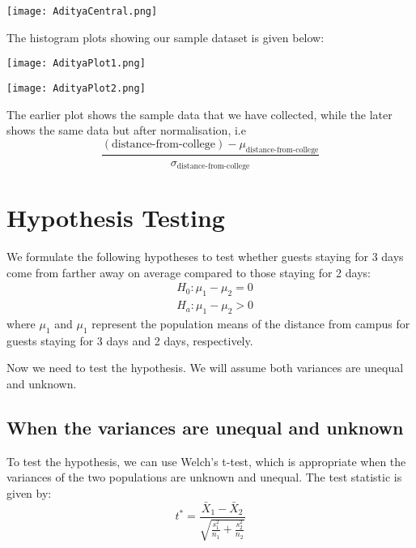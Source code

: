\documentclass[oneside]{book}
\begin{document}
\begin{minipage}{\textwidth}
    \centering
    \texttt{[image: AdityaCentral.png]}
    \label{fig:enter-label}
\end{minipage}

The histogram plots showing our sample dataset is given below:

\begin{minipage}{\textwidth}
    \centering
    \texttt{[image: AdityaPlot1.png]}
    \label{fig:enter-label}
\end{minipage}
\begin{minipage}{\textwidth}
    \centering
    \texttt{[image: AdityaPlot2.png]}
    \label{fig:enter-label}
\end{minipage}

The earlier plot shows the sample data that we have collected, while the later shows the same data but after normalisation, i.e 
\[\frac{(\text{distance-from-college}) - \mu_{\text{distance-from-college}}}{\sigma_{\text{distance-from-college}}}\]


\section{Hypothesis Testing}
We formulate the following hypotheses to test whether guests staying for 3 days come from farther away on average compared to those staying for 2 days:
\begin{align*}
& H_0: \mu_1 - \mu_2 = 0 \\
& H_a: \mu_1 - \mu_2 > 0
\end{align*}
where $\mu_1$ and $\mu_1$ represent the population means of the distance from campus for guests staying for 3 days and 2 days, respectively.

Now we need to test the hypothesis. We will assume both variances are unequal and unknown.

\subsection{When the variances are unequal and unknown}
To test the hypothesis, we can use Welch's t-test, which is appropriate when the variances of the two populations are unknown and unequal. The test statistic is given by:
\[ t^* = \frac{\bar{X}_1 - \bar{X}_2}{\sqrt{\frac{s_1^2}{n_1} + \frac{s_2^2}{n_2}}} \]
\end{document}
